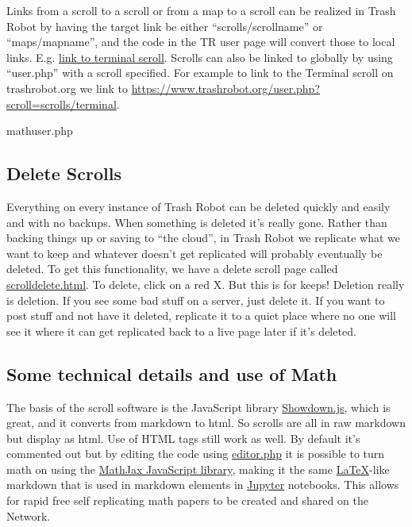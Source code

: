 Links from a scroll to a scroll or from a map to a scroll can be
realized in Trash Robot by having the target link be either
``scrolls/scrollname'' or ``maps/mapname'', and the code in the TR user
page will convert those to local links. E.g.
\href{scrolls/terminal}{link to terminal scroll}. Scrolls can also be
linked to globally by using ``user.php'' with a scroll specified. For
example to link to the Terminal scroll on trashrobot.org we link to
\url{https://www.trashrobot.org/user.php?scroll=scrolls/terminal}.

mathuser.php

\subsection{Delete Scrolls}\label{delete-scrolls}

Everything on every instance of Trash Robot can be deleted quickly and
easily and with no backups. When something is deleted it's really gone.
Rather than backing things up or saving to ``the cloud'', in Trash Robot
we replicate what we want to keep and whatever doesn't get replicated
will probably eventually be deleted. To get this functionality, we have
a delete scroll page called \url{scrolldelete.html}. To delete, click on
a red X. But this is for keeps! Deletion really is deletion. If you see
some bad stuff on a server, just delete it. If you want to post stuff
and not have it deleted, replicate it to a quiet place where no one will
see it where it can get replicated back to a live page later if it's
deleted.

\subsection{Some technical details and use of
Math}\label{some-technical-details-and-use-of-math}

The basis of the scroll software is the JavaScript library
\href{http://showdownjs.com/}{Showdown.js}, which is great, and it
converts from markdown to html. So scrolls are all in raw markdown but
display as html. Use of HTML tags still work as well. By default it's
commented out but by editing the code using \url{editor.php} it is
possible to turn math on using the
\href{https://www.mathjax.org/}{MathJax JavaScript library}, making it
the same \href{https://www.latex-project.org/}{LaTeX}-like markdown that
is used in markdown elements in \href{https://jupyter.org/}{Jupyter}
notebooks. This allows for rapid free self replicating math papers to be
created and shared on the Network.

